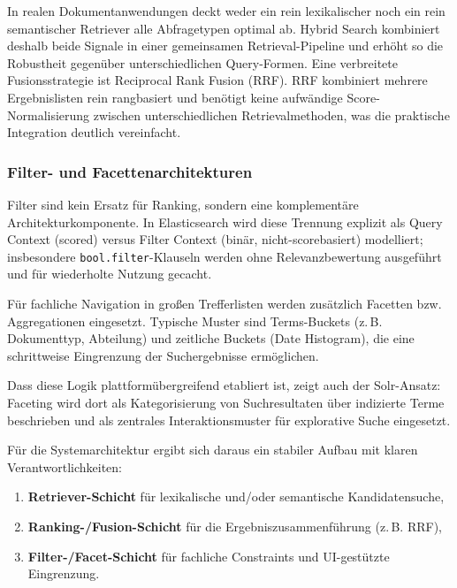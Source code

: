 In realen Dokumentanwendungen deckt weder ein rein lexikalischer noch ein rein
semantischer Retriever alle Abfragetypen optimal ab.
Hybrid Search kombiniert deshalb beide Signale in einer gemeinsamen
Retrieval-Pipeline und erhöht so die Robustheit gegenüber unterschiedlichen
Query-Formen. Eine verbreitete Fusionsstrategie ist Reciprocal Rank Fusion (RRF).
RRF kombiniert mehrere Ergebnislisten rein rangbasiert und benötigt keine aufwändige
Score-Normalisierung zwischen unterschiedlichen Retrievalmethoden, was die praktische
Integration deutlich vereinfacht. \cite{elastic_rrf,elastic_knn_search}

\subsubsection{Filter- und Facettenarchitekturen}

Filter sind kein Ersatz für Ranking, sondern eine komplementäre
Architekturkomponente.
In Elasticsearch wird diese Trennung explizit als Query Context (scored) versus
Filter Context (binär, nicht-scorebasiert) modelliert; insbesondere
\texttt{bool.filter}-Klauseln werden ohne Relevanzbewertung ausgeführt und für
wiederholte Nutzung gecacht.
\cite{elastic_query_filter_context,elastic_bool_query}

Für fachliche Navigation in großen Trefferlisten werden zusätzlich Facetten bzw.
Aggregationen eingesetzt.
Typische Muster sind Terms-Buckets (z.\,B. Dokumenttyp, Abteilung) und zeitliche
Buckets (Date Histogram), die eine schrittweise Eingrenzung der Suchergebnisse
ermöglichen.
\cite{elastic_bucket_aggregation,elastic_terms_aggregation,elastic_date_histogram}

Dass diese Logik plattformübergreifend etabliert ist, zeigt auch der Solr-Ansatz:
Faceting wird dort als Kategorisierung von Suchresultaten über indizierte Terme
beschrieben und als zentrales Interaktionsmuster für explorative Suche eingesetzt.
\cite{solr_faceting}

Für die Systemarchitektur ergibt sich daraus ein stabiler Aufbau mit klaren
Verantwortlichkeiten:

\begin{enumerate}
    \item \textbf{Retriever-Schicht}
          für lexikalische und/oder semantische Kandidatensuche,
          \cite{elastic_knn_search}

    \item \textbf{Ranking-/Fusion-Schicht}
          für die Ergebniszusammenführung (z.\,B. RRF),
          \cite{elastic_rrf}

    \item \textbf{Filter-/Facet-Schicht}
          für fachliche Constraints und UI-gestützte Eingrenzung.
          \cite{elastic_query_filter_context,elastic_terms_aggregation}
\end{enumerate}


